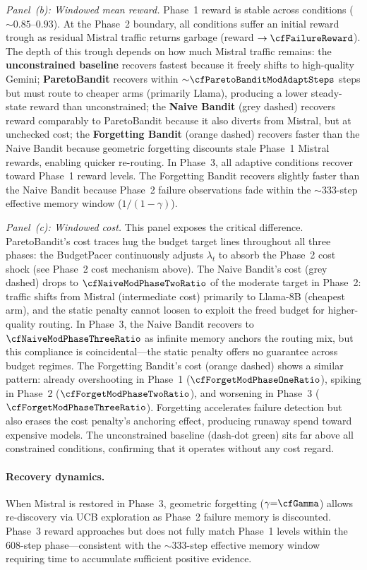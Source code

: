 \emph{Panel~(b): Windowed mean reward.}
Phase~1 reward is stable across conditions (${\sim}0.85$--$0.93$).
At the Phase~2 boundary, all conditions suffer an initial reward
trough as residual Mistral traffic returns garbage (reward
$\to\cfFailureReward$).  The depth of this trough depends on how
much Mistral traffic remains:
the \textbf{unconstrained baseline} recovers fastest because it
freely shifts to high-quality Gemini;
\textbf{ParetoBandit} recovers within ${\sim}\cfParetoBanditModAdaptSteps$ steps
but must route to cheaper arms (primarily Llama), producing a lower
steady-state reward than unconstrained;
the \textbf{Naive Bandit} (grey dashed) recovers reward comparably
to ParetoBandit because it also diverts from Mistral, but at
unchecked cost;
the \textbf{Forgetting Bandit} (orange dashed) recovers faster
than the Naive Bandit because geometric forgetting discounts stale
Phase~1 Mistral rewards, enabling quicker re-routing.
In Phase~3, all adaptive conditions recover toward Phase~1 reward
levels.  The Forgetting Bandit recovers slightly faster than the
Naive Bandit because Phase~2 failure observations fade within the
${\sim}333$-step effective memory window ($1/(1{-}\gamma)$).

\emph{Panel~(c): Windowed cost.}
This panel exposes the critical difference.  ParetoBandit's cost
traces hug the budget target lines throughout all three phases:
the BudgetPacer continuously adjusts $\lambda_t$ to absorb the
Phase~2 cost shock (see Phase~2 cost mechanism above).
The Naive Bandit's cost (grey dashed) drops to
$\cfNaiveModPhaseTwoRatio$ of the moderate target in Phase~2:
traffic shifts from Mistral (intermediate cost) primarily to
Llama-8B (cheapest arm), and the static penalty cannot loosen
to exploit the freed budget for higher-quality routing.
In Phase~3, the Naive Bandit recovers to
$\cfNaiveModPhaseThreeRatio$ as infinite memory anchors the
routing mix, but this compliance is coincidental---the static
penalty offers no guarantee across budget regimes.
The Forgetting Bandit's cost (orange dashed) shows a similar
pattern: already overshooting in Phase~1
($\cfForgetModPhaseOneRatio$), spiking in Phase~2
($\cfForgetModPhaseTwoRatio$), and worsening in Phase~3
($\cfForgetModPhaseThreeRatio$).  Forgetting accelerates
failure detection but also erases the cost penalty's anchoring
effect, producing runaway spend toward expensive models.
The unconstrained baseline (dash-dot green) sits far above all
constrained conditions, confirming that it operates without any
cost regard.

\paragraph{Recovery dynamics.}
When Mistral is restored in Phase~3, geometric forgetting
($\gamma{=}\cfGamma$) allows re-discovery via UCB exploration
as Phase~2 failure memory is discounted.  Phase~3 reward
approaches but does not fully match Phase~1 levels within the
608-step phase---consistent with the ${\sim}333$-step effective
memory window requiring time to accumulate sufficient positive
evidence.

